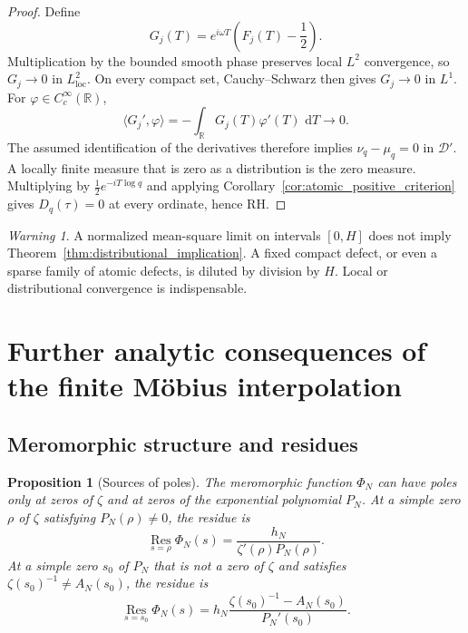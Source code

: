 \documentclass[11pt]{amsart}
\numberwithin{equation}{section}
\theoremstyle{plain}
\newtheorem{proposition}[theorem]{Proposition}
\theoremstyle{definition}
\theoremstyle{remark}
\newtheorem{warning}[theorem]{Warning}
\newcommand{\RH}{\mathrm{RH}}
\newcommand{\1}{\mathbf{1}}
\newcommand{\dd}{\,\mathrm{d}}
\begin{document}
\begin{proof}
Define
\begin{equation}
G_j(T)
=
e^{i\omega T}\left(F_j(T)-\frac12\right).
\label{eq:distributional_Gj_detailed}
\end{equation}
Multiplication by the bounded smooth phase preserves local \(L^2\)
convergence, so \(G_j\to0\) in \(L^2_{\mathrm{loc}}\).  On every compact
set, Cauchy--Schwarz then gives \(G_j\to0\) in \(L^1\).  For
\(\varphi\in C_c^\infty(\mathbb R)\),
\begin{equation}
\langle G_j',\varphi\rangle
=
-\int_{\mathbb R}G_j(T)\varphi'(T)\,\dd T
\longrightarrow0.
\label{eq:distributional_derivative_limit_detailed}
\end{equation}
The assumed identification of the derivatives therefore implies
\(\nu_q-\mu_q=0\) in \(\mathcal D'\).  A locally finite measure that is
zero as a distribution is the zero measure.  Multiplying by
\(\frac12e^{-iT\log q}\) and applying
Corollary~\ref{cor:atomic_positive_criterion} gives
\(D_q(\tau)=0\) at every ordinate, hence \(\RH\).
\end{proof}

\begin{warning}
\label{warn:global_mean_not_local}
A normalized mean-square limit on intervals \([0,H]\) does not imply
Theorem~\ref{thm:distributional_implication}.  A fixed compact defect, or
even a sparse family of atomic defects, is diluted by division by \(H\).
Local or distributional convergence is indispensable.
\end{warning}


\section{Further analytic consequences of the finite Möbius interpolation}
\label{sec:further_mobius_consequences}

\subsection{Meromorphic structure and residues}
\label{subsec:meromorphic_structure}

\begin{proposition}[Sources of poles]
\label{prop:sources_of_poles}
The meromorphic function $\Phi_N$ can have poles only at zeros of $\zeta$
and at zeros of the exponential polynomial $P_N$.  At a simple zero $\rho$
of $\zeta$ satisfying $P_N(\rho)\neq0$, the residue is
\begin{equation}
\operatorname*{Res}_{s=\rho}\Phi_N(s)
=
\frac{h_N}{\zeta'(\rho)P_N(\rho)}.
\label{eq:Phi_residue_zeta_zero}
\end{equation}
At a simple zero $s_0$ of $P_N$ that is not a zero of $\zeta$ and satisfies
$\zeta(s_0)^{-1}\neq A_N(s_0)$, the residue is
\begin{equation}
\operatorname*{Res}_{s=s_0}\Phi_N(s)
=
h_N\frac{\zeta(s_0)^{-1}-A_N(s_0)}{P_N'(s_0)}.
\label{eq:Phi_residue_P_zero}
\end{equation}
\end{proposition}
\end{document}
